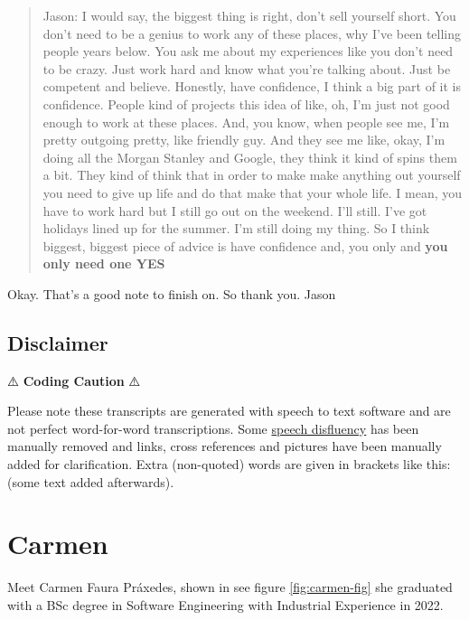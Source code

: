 \documentclass[
]{book}
\begin{document}
\begin{quote}
Jason: I would say, the biggest thing is right, don't sell yourself short. You don't need to be a genius to work any of these places, why I've been telling people years below. You ask me about my experiences like you don't need to be crazy. Just work hard and know what you're talking about. Just be competent and believe. Honestly, have confidence, I think a big part of it is confidence. People kind of projects this idea of like, oh, I'm just not good enough to work at these places. And, you know, when people see me, I'm pretty outgoing pretty, like friendly guy. And they see me like, okay, I'm doing all the Morgan Stanley and Google, they think it kind of spins them a bit. They kind of think that in order to make make anything out yourself you need to give up life and do that make that your whole life. I mean, you have to work hard but I still go out on the weekend. I'll still. I've got holidays lined up for the summer. I'm still doing my thing. So I think biggest, biggest piece of advice is have confidence and, you only and \textbf{you only need one YES}
\end{quote}

Okay. That's a good note to finish on. So thank you. Jason

\hypertarget{disclaimer-2}{%
\section{Disclaimer}\label{disclaimer-2}}

⚠️ \textbf{Coding Caution} ⚠️

Please note these transcripts are generated with speech to text software and are not perfect word-for-word transcriptions. Some \href{https://en.wikipedia.org/wiki/Speech_disfluency}{speech disfluency} has been manually removed and links, cross references and pictures have been manually added for clarification. Extra (non-quoted) words are given in brackets like this: (some text added afterwards).

\hypertarget{carmen}{%
\chapter{Carmen}\label{carmen}}

Meet Carmen Faura Práxedes, shown in see figure \ref{fig:carmen-fig} she graduated with a BSc degree in Software Engineering with Industrial Experience in 2022.
\end{document}
